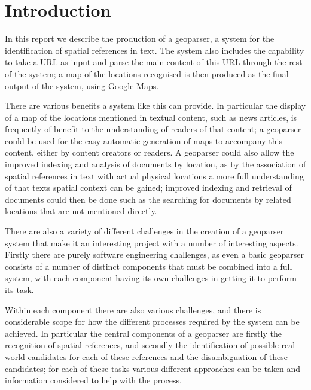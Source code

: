 \documentclass[12pt, a4paper]{report}
\begin{document}
\glsaddall
\printglossaries

\chapter{Introduction}


In this report we describe the production of a geoparser, a system for the identification of spatial references in text. The system also includes the capability to take a URL as input and parse the main content of this URL through the rest of the system; a map of the locations recognised is then produced as the final output of the system, using Google Maps.

There are various benefits a system like this can provide. In particular the display of a map of the locations mentioned in textual content, such as news articles, is frequently of benefit to the understanding of readers of that content; a geoparser could be used for the easy automatic generation of maps to accompany this content, either by content creators or readers. A geoparser could also allow the improved indexing and analysis of documents by location, as by the association of spatial references in text with actual physical locations a more full understanding of that texts spatial context can be gained; improved indexing and retrieval of documents could then be done such as the searching for documents by related locations that are not mentioned directly.

There are also a variety of different challenges in the creation of a geoparser system that make it an interesting project with a number of interesting  aspects. Firstly there are purely software engineering challenges, as even a basic geoparser consists of a number of distinct components that must be combined into a full system, with each component having its own challenges in getting it to perform its task.

Within each component there are also various challenges, and there is considerable scope for how the different processes required by the system can be achieved. In particular the central components of a geoparser are firstly the recognition of spatial references, and secondly the identification of possible real-world candidates for each of these references and the disambiguation of these candidates; for each of these tasks various different approaches can be taken and information considered to help with the process.
\end{document}
